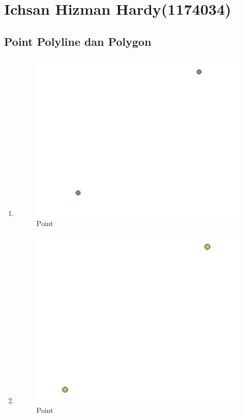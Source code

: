 \section{Ichsan Hizman Hardy(1174034)}
\subsection{Point Polyline dan Polygon}
\begin{enumerate}
	\item 
	
	\begin{figure}[H]
		\includegraphics[width=12cm]{figures/1174034/No1.JPG}
		\centering
		\caption{Point}
	\end{figure}
	
	\item 
	
	\begin{figure}[H]
		\includegraphics[width=12cm]{figures/1174034/No2.JPG}
		\centering
		\caption{Point}
	\end{figure}
	

\end{enumerate}
